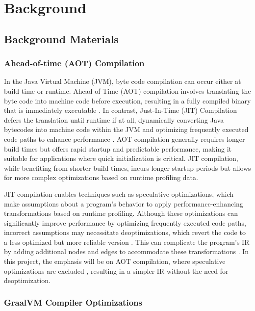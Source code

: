 \chapter[Background and Related Works]{Background}

\section{Background Materials}
\subsection{Ahead-of-time (AOT) Compilation}
In the Java Virtual Machine (JVM), byte code compilation can occur either at build time or runtime. Ahead-of-Time (AOT) compilation involves translating the byte code into machine code before execution, resulting in a fully compiled binary that is immediately executable \cite{Wade2017}. In contrast, Just-In-Time (JIT) Compilation defers the translation until runtime if at all, dynamically converting Java bytecodes into machine code within the JVM and optimizing frequently executed code paths to enhance performance \cite{Wade2017}. AOT compilation generally requires longer build times but offers rapid startup and predictable performance, making it suitable for applications where quick initialization is critical. JIT compilation, while benefiting from shorter build times, incurs longer startup periods but allows for more complex optimizations based on runtime profiling data.

JIT compilation enables techniques such as speculative optimizations, which make assumptions about a program’s behavior to apply performance-enhancing transformations based on runtime profiling. Although these optimizations can significantly improve performance by optimizing frequently executed code paths, incorrect assumptions may necessitate deoptimizations, which revert the code to a less optimized but more reliable version \cite{Duboscq2013Inproceedings}. This can complicate the program's IR by adding additional nodes and edges to accommodate these transformations \cite{Duboscq2013Inproceedings}. In this project, the emphasis will be on AOT compilation, where speculative optimizations are excluded \cite{Wimmer2019}, resulting in a simpler IR without the need for deoptimization.

\subsection{GraalVM Compiler Optimizations}

